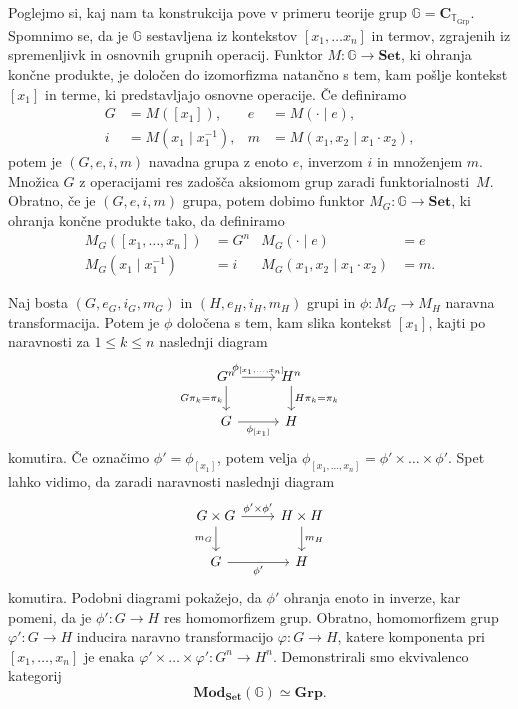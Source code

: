 \documentclass[../kategoricna_logika.tex]{subfiles}
\begin{document}
\begin{primer}
  Poglejmo si, kaj nam ta konstrukcija pove v primeru teorije grup
  $\mathbb{G} = \mathbf{C}_{\mathbb{T}_{\mathrm{Grp}}}$. Spomnimo se,
  da je $\mathbb{G}$ sestavljena iz kontekstov $[x_1, \ldots x_n]$ in
  termov, zgrajenih iz spremenljivk in osnovnih grupnih operacij.
  Funktor $M : \mathbb{G} \to \mathbf{Set}$, ki ohranja končne produkte, 
  je določen do izomorfizma natančno s tem, kam pošlje kontekst $[x_1]$
  in terme, ki predstavljajo osnovne operacije. Če definiramo
\begin{align*}
  G &= M([x_1]), & e &= M(\cdot \mid e), \\
  i &= M(x_1 \mid x_1^{-1}), & m &= M(x_1,x_2 \mid x_1 \cdot x_2),
\end{align*}
potem je $(G,e,i,m)$ navadna grupa z enoto $e$, inverzom $i$ in
množenjem $m$. Množica $G$ z operacijami res zadošča aksiomom
grup zaradi funktorialnosti~$M$. Obratno, če je $(G,e,i,m)$ grupa,
potem dobimo funktor $M_{G} : \mathbb{G} \to \mathbf{Set}$,
ki ohranja končne produkte tako, da definiramo
\begin{align*}
  M_{G}([x_1, \ldots, x_n]) &= G^n & M_{G}(\cdot \mid e) &= e \\
  M_{G}(x_1 \mid x_1^{-1}) &= i & M_{G}(x_1, x_2 \mid x_1 \cdot x_2) &= m.
\end{align*}

Naj bosta $(G,e_{G}, i_{G}, m_{G})$ in $(H, e_H, i_H, m_H)$ grupi
in ${\phi : M_{G} \to M_H}$ naravna transformacija.
Potem je $\phi$ določena s tem, kam slika kontekst $[x_1]$,
kajti po naravnosti za $1 \leq k \leq n$ naslednji diagram
\begin{equation*}
\begin{tikzcd}\label{primer:grupe-kot-funktorji}
  G^n \ar[d, "G\pi_k = \pi_k"'] \ar[r, "\phi_{[x_1, \ldots, x_n]}"] & H^n \ar[d, "H\pi_k = \pi_k"] \\
  G \ar[r, "\phi_{[x_1]}"'] & H
\end{tikzcd}
\end{equation*}
komutira. Če označimo $\phi' = \phi_{[x_1]}$, potem velja
$\phi_{[x_1, \ldots, x_n]} = \phi' \times \ldots \times \phi'$.
Spet lahko vidimo, da zaradi naravnosti naslednji diagram
\begin{equation*}
\begin{tikzcd}\label{sec:modeli-kot-funtorji-3}
  G \times G \ar[d, "m_{G}"'] \ar[r, "\phi' \times \phi'"] & H \times H \ar[d, "m_H"] \\
  G \ar[r, "\phi'"'] & H
\end{tikzcd}
\end{equation*}
komutira. Podobni diagrami pokažejo, da $\phi'$ ohranja enoto in
inverze, kar pomeni, da je $\phi' : G \to H$ res homomorfizem grup.
Obratno, homomorfizem grup ${\varphi' : G \to H}$ inducira naravno
transformacijo $\varphi : G \to H$, katere komponenta pri
$[x_1, \ldots, x_n]$ je enaka $\varphi' \times \ldots \times \varphi' : G^n \to H^n$.
Demonstrirali smo ekvivalenco kategorij
\[ \mathbf{Mod}_{\mathbf{Set}}(\mathbb{G}) \simeq \mathbf{Grp}. \]
\end{primer}
\end{document}

